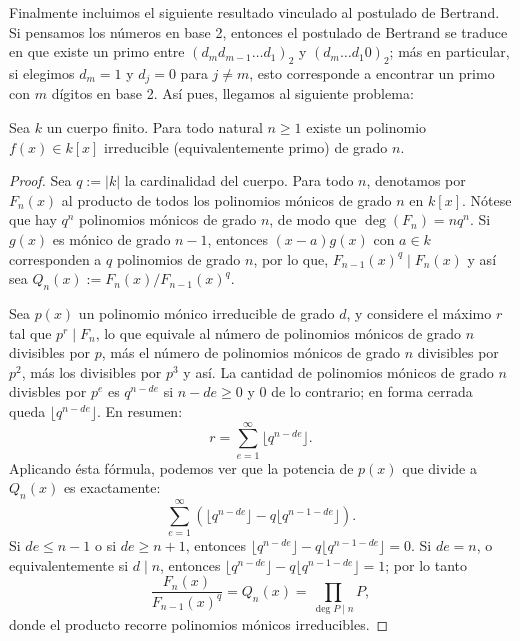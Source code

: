 \documentclass[teoria-numeros.tex]{subfiles}
\begin{document}
Finalmente incluimos el siguiente resultado vinculado al postulado de Bertrand.
Si pensamos los números en base 2, entonces el postulado de Bertrand se traduce en que existe un primo entre $(d_md_{m-1}\dots d_1)_2$
y $(d_m\dots d_1 0)_2$; más en particular, si elegimos $d_m = 1$ y $d_j = 0$ para $j \ne m$, esto corresponde a encontrar un primo con $m$ dígitos en base 2.
Así pues, llegamos al siguiente problema:
\begin{thm}
	Sea $k$ un cuerpo finito.
	Para todo natural $n \ge 1$ existe un polinomio $f(x) \in k[x]$ irreducible (equivalentemente primo) de grado $n$.
\end{thm}
\begin{proof}
	Sea $q := |k|$ la cardinalidad del cuerpo.
	Para todo $n$, denotamos por $F_n(x)$ al producto de todos los polinomios mónicos de grado $n$ en $k[x]$.
	Nótese que hay $q^n$ polinomios mónicos de grado $n$, de modo que $\deg(F_n) = nq^n$.
	Si $g(x)$ es mónico de grado $n-1$, entonces $(x - a)g(x)$ con $a \in k$ corresponden a $q$ polinomios de grado $n$,
	por lo que, $F_{n-1}(x)^q \mid F_n(x)$ y así sea $Q_n(x) := F_n(x) / F_{n-1}(x)^q$.

	Sea $p(x)$ un polinomio mónico irreducible de grado $d$, y considere el máximo $r$ tal que $p^r \mid F_n$,
	lo que equivale al número de polinomios mónicos de grado $n$ divisibles por $p$,
	más el número de polinomios mónicos de grado $n$ divisibles por $p^2$, más los divisibles por $p^3$ y así.
	La cantidad de polinomios mónicos de grado $n$ divisbles por $p^e$ es $q^{n - de}$ si $n - de \ge 0$ y 0 de lo contrario;
	en forma cerrada queda $\lfloor q^{n - de} \rfloor$.
	En resumen:
	$$ r = \sum_{e=1}^{\infty} \lfloor q^{n - de} \rfloor. $$
	Aplicando ésta fórmula, podemos ver que la potencia de $p(x)$ que divide a $Q_n(x)$ es exactamente:
	$$ \sum_{e=1}^{\infty} (\lfloor q^{n - de} \rfloor - q \lfloor q^{n - 1 - de} \rfloor). $$
	Si $de \le n - 1$ o si $de \ge n + 1$, entonces $\lfloor q^{n - de} \rfloor - q \lfloor q^{n - 1 - de} \rfloor = 0$.
	Si $de = n$, o equivalentemente si $d \mid n$, entonces $\lfloor q^{n - de} \rfloor - q \lfloor q^{n - 1 - de} \rfloor = 1$;
	por lo tanto
	$$ \frac{F_n(x)}{F_{n-1}(x)^q} = Q_n(x) = \prod_{\deg P \mid n} P, $$
	donde el producto recorre polinomios mónicos irreducibles.


\end{proof}
\end{document}
